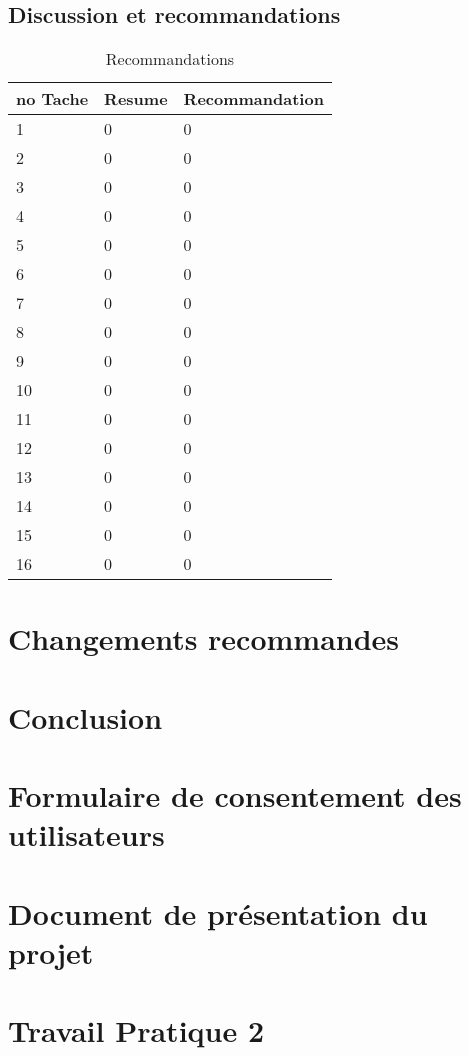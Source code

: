 \documentclass[letterpaper, oneside, 12pt, these, creativecommons]{thETS}
\begin{document}
\newpage

\section{Discussion et recommandations}

\begin{table}
	\centering
	\begin{tabular}{|l|l|l|}
	\hline
	no Tache	& Resume	& Recommandation 	\\ \hline
	1		& 0		& 0 			\\ \hline
	2		& 0		& 0 			\\ \hline
	3		& 0		& 0 			\\ \hline
	4		& 0		& 0 			\\ \hline
	5		& 0		& 0 			\\ \hline
	6		& 0		& 0 			\\ \hline
	7		& 0		& 0 			\\ \hline
	8		& 0		& 0 			\\ \hline
	9		& 0		& 0 			\\ \hline
	10		& 0		& 0 			\\ \hline
	11		& 0		& 0 			\\ \hline
	12		& 0		& 0 			\\ \hline
	13		& 0		& 0 			\\ \hline
	14		& 0		& 0 			\\ \hline
	15		& 0		& 0 			\\ \hline
	16		& 0		& 0 			\\ \hline
	\end{tabular}
	\caption{Recommandations}
\end{table}

\chapter{Changements recommandes}

\chapter{Conclusion}

\appendix
\multiannexe

\chapter{Formulaire de consentement des utilisateurs}



\chapter{Document de présentation du projet}



\chapter{Travail Pratique 2}


\end{document}
